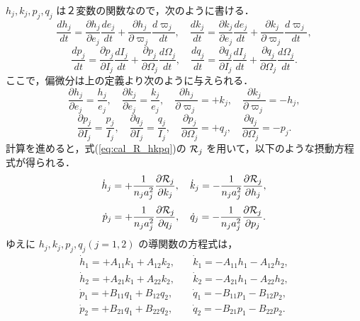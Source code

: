 \documentclass[11pt,a4paper,oneside,onecolumn]{jreport}
\begin{document}
$h_j, k_j, p_j, q_j$ は２変数の関数なので，次のように書ける．
\begin{equation}
\frac{d h_j}{dt} = \frac{\partial h_j}{\partial e_j} \frac{d e_j}{dt} + \frac{\partial h_j}{\partial \varpi_j} \frac{d \varpi_j}{dt} , \quad \frac{d k_j}{dt} = \frac{\partial k_j}{\partial e_j} \frac{d e_j}{dt} + \frac{\partial k_j}{\partial \varpi_j} \frac{d \varpi_j}{dt},
\end{equation}
\begin{equation}
\frac{d p_j}{dt} = \frac{\partial p_j}{\partial I_j} \frac{d I_j}{dt} + \frac{\partial p_j}{\partial \Omega_j} \frac{d \Omega_j}{dt} , \quad \frac{d q_j}{dt} = \frac{\partial q_j}{\partial I_j} \frac{d I_j}{dt} + \frac{\partial q_j}{\partial \Omega_j} \frac{d \Omega_j}{dt}.
\end{equation}
ここで，偏微分は上の定義より次のように与えられる．
\begin{equation}
\frac{\partial h_j}{\partial e_j} = \frac{h_j}{e_j}, \quad \frac{\partial k_j}{\partial e_j} = \frac{k_j}{e_j}, \quad \frac{\partial h_j}{\partial \varpi_j} = + k_j, \quad \frac{\partial k_j}{\partial \varpi_j} = - h_j,
\end{equation}
\begin{equation}
\frac{\partial p_j}{\partial I_j} = \frac{p_j}{I_j}, \quad \frac{\partial q_j}{\partial I_j} = \frac{q_j}{I_j}, \quad \frac{\partial p_j}{\partial \Omega_j} = + q_j, \quad \frac{\partial q_j}{\partial \Omega_j} = - p_j.
\end{equation}
計算を進めると，式(\ref{eq:cal_R_hkpq})の ${\cal R}_j$ を用いて，以下のような摂動方程式が得られる．
\begin{equation}
\dot{h}_j = + \frac{1}{n_j a_j^2} \frac{\partial {\cal R}_j}{\partial k_j}, \quad \dot{k}_j = - \frac{1}{n_j a_j^2} \frac{\partial {\cal R}_j}{\partial h_j},
\end{equation}
\begin{equation}
\dot{p}_j = + \frac{1}{n_j a_j^2} \frac{\partial {\cal R}_j}{\partial q_j}, \quad \dot{q}_j = - \frac{1}{n_j a_j^2} \frac{\partial {\cal R}_j}{\partial p_j}.
\end{equation}
ゆえに $h_j, k_j, p_j, q_j (j = 1, 2)$ の導関数の方程式は，
\begin{equation}
\begin{split}
\dot{h}_1= + A_{11} k_1 + A_{12} k_2, & \quad \dot{k}_1 = - A_{11} h_1 - A_{12} h_2, \\
\dot{h}_2 = + A_{21} k_1 + A_{22} k_2, & \quad \dot{k}_2 = - A_{21} h_1 - A_{22} h_2, \\
\dot{p}_1 = + B_{11} q_1 + B_{12} q_2, & \quad \dot{q}_1 = - B_{11} p_1 - B_{12} p_2, \\
\dot{p}_2 = + B_{21} q_1 + B_{22} q_2, & \quad \dot{q}_2 = - B_{21} p_1 - B_{22} p_2.
\end{split}
\end{equation}
\end{document}
